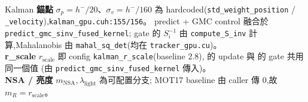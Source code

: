 \begin{implsupp}{Kalman}
\textbf{錨點}\;\;
\(\sigma_p=h^-/20\)、\(\sigma_v=h^-/160\) 為 hardcoded(\texttt{std\_weight\_position}
/ \texttt{\_velocity}),\texttt{kalman\_gpu.cuh:155/156}。\quad
predict + GMC control 融合於 \texttt{predict\_gmc\_sinv\_fused\_kernel};
gate 的 \(S_i^{-1}\) 由 \texttt{compute\_S\_inv} 計算,Mahalanobis 由
\texttt{mahal\_sq\_det}(均在 \texttt{tracker\_gpu.cu})。\\
\textbf{r\_scale}\;\; \(r_{\mathrm{scale}}\) 即 config \texttt{kalman\_r\_scale}(baseline 2.8),
 的 update 與  的 gate 共用同一個值
(由 \texttt{predict\_gmc\_sinv\_fused\_kernel} 傳入)。\\
\textbf{NSA / 亮度}\;\; \(m_{\mathrm{NSA}},\lambda_{\mathrm{light}}\) 為可配置分支;
MOT17 baseline 由 caller 傳 \(0\),故 \(m_R=r_{\mathrm{scale}}\)。
\end{implsupp}
